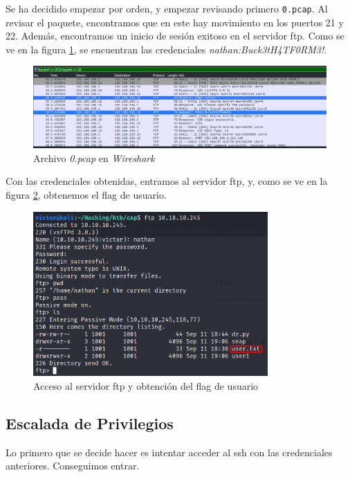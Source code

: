 Se ha decidido empezar por orden, y empezar revisando primero \texttt{0.pcap}. Al revisar el paquete, encontramos que en este hay movimiento en los puertos 21 y 22. Además, encontramos un inicio de sesión exitoso en el servidor \acrshort{ftp}. Como se ve en la figura \ref{fig:cap-wire-0}, se encuentran las credenciales \textit{nathan:Buck3tH4TF0RM3!}.\\
\begin{figure}[h]
    \centering
    \includegraphics[width=1.0\textwidth]{images/machines/cap/wireshark-0.png}
    \caption{Archivo \textit{0.pcap} en \textit{Wireshark}}
    \label{fig:cap-wire-0}
\end{figure}

Con las credenciales obtenidas, entramos al servidor \acrshort{ftp}, y, como se ve en la figura \ref{fig:cap-user-flag}, obtenemos el flag de usuario.
\begin{figure}[h]
    \centering
    \includegraphics[width=0.8\textwidth]{images/machines/cap/user-flag.png}
    \caption{Acceso al servidor \acrshort{ftp} y obtención del flag de usuario}
    \label{fig:cap-user-flag}
\end{figure}

\subsection{Escalada de Privilegios}

Lo primero que se decide hacer es intentar acceder al \acrshort{ssh} con las credenciales anteriores. Conseguimos entrar.\\

